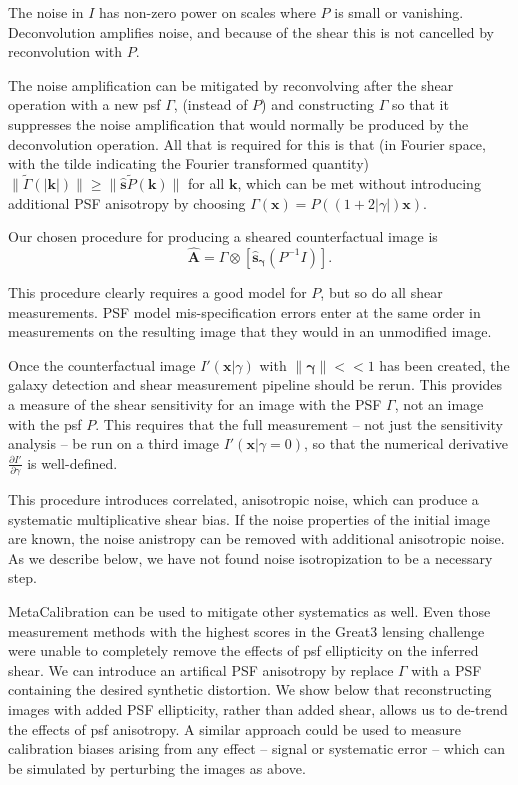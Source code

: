 \documentclass[iop]{emulateapj}
\begin{document}
The noise in $I$ has non-zero power on scales where $P$ is small or
vanishing. Deconvolution amplifies noise, and because of the shear
this is not cancelled by reconvolution with $P$.

The noise amplification can be mitigated by reconvolving after the
shear operation with a new psf $\Gamma$, (instead of $P$) and
constructing $\Gamma$ so that it suppresses the noise amplification
that would normally be produced by the deconvolution operation. All
that is required for this is that (in Fourier space, with the tilde
indicating the Fourier transformed quantity)
$\|\tilde{\Gamma}(\mathbf{|k|}) \| \geq \|\hat{\mathbf{s}}
\tilde{P}(\mathbf{k})\|$ for all $\mathbf{k}$, which can be met
without introducing additional PSF anisotropy by choosing
$\Gamma(\mathbf{x}) = P\left((1+2|\gamma|)\mathbf{x}\right)$.

Our chosen procedure for producing a sheared counterfactual image is
\begin{equation}
\hat{\mathbf{A}}  = \Gamma \otimes \left[\hat{\mathbf{s}}_{\boldsymbol \gamma} \left(P^{-1} I \right)\right].
\end{equation}

This procedure clearly requires a good model for $P$, but so do all
shear measurements. PSF model mis-specification errors enter at the
same order in measurements on the resulting image that they would in
an unmodified image.

Once the counterfactual image $I'(\mathbf{x}|\gamma)$ with
$\|{\boldsymbol \gamma}\| << 1$ has been created, the galaxy detection
and shear measurement pipeline should be rerun. This provides a measure
of the shear sensitivity for an image with the PSF $\Gamma$, not an
image with the psf $P$. This requires that the full measurement -- not
just the sensitivity analysis -- be run on a third image
$I'(\mathbf{x}|\gamma=0)$, so that the numerical derivative
$\frac{\partial I'}{\partial \gamma}$ is well-defined.

This procedure introduces correlated, anisotropic noise, which can
produce a systematic multiplicative shear bias. If the noise
properties of the initial image are known, the noise anistropy can be
removed with additional anisotropic noise. As we describe below, we
have not found noise isotropization to be a necessary step.

MetaCalibration can be used to mitigate other systematics as
well. Even those measurement methods with the highest scores in the
Great3 lensing challenge were unable to completely remove the effects
of psf ellipticity on the inferred shear. We can introduce an
artifical PSF anisotropy by replace $\Gamma$ with a PSF containing the
desired synthetic distortion.  We show below that reconstructing
images with added PSF ellipticity, rather than added shear, allows us
to de-trend the effects of psf anisotropy. A similar approach could be
used to measure calibration biases arising from any effect -- signal
or systematic error -- which can be simulated by perturbing the images
as above.
\end{document}
